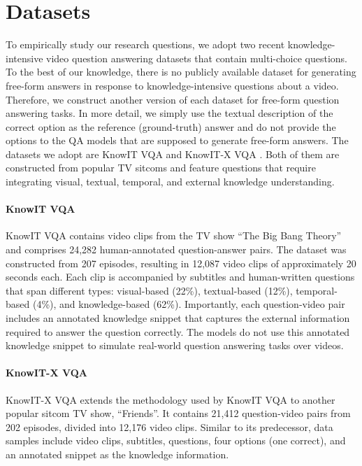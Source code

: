 \section{Datasets}
\label{sec:data}
To empirically study our research questions, we adopt two recent knowledge-intensive video question answering datasets that contain multi-choice questions. To the best of our knowledge, there is no publicly available dataset for generating free-form answers in response to knowledge-intensive questions about a video. Therefore, we construct another version of each dataset for free-form question answering tasks. In more detail, we simply use the textual description of the correct option as the reference (ground-truth) answer and do not provide the options to the QA models that are supposed to generate free-form answers. The datasets we adopt are KnowIT VQA \cite{garcia2020knowit} and KnowIT-X VQA \cite{wu2021transferring}. Both of them are constructed from popular TV sitcoms and feature questions that require integrating visual, textual, temporal, and external knowledge understanding.

\paragraph{\textbf{KnowIT VQA}}
KnowIT VQA \cite{garcia2020knowit} contains video clips from the TV show ``The Big Bang Theory'' and comprises 24,282 human-annotated question-answer pairs. The dataset was constructed from 207 episodes, resulting in 12,087 video clips of approximately 20 seconds each. Each clip is accompanied by subtitles and human-written questions that span different types: visual-based (22\%), textual-based (12\%), temporal-based (4\%), and knowledge-based (62\%). Importantly, each question-video pair includes an annotated knowledge snippet that captures the external information required to answer the question correctly. The models do not use this annotated knowledge snippet to simulate real-world question answering tasks over videos.

\paragraph{\textbf{KnowIT-X VQA}}
KnowIT-X VQA \cite{wu2021transferring} extends the methodology used by KnowIT VQA to another popular sitcom TV show, ``Friends''. It contains 21,412 question-video pairs from 202 episodes, divided into 12,176 video clips. Similar to its predecessor, data samples include video clips, subtitles, questions, four options (one correct), and an annotated snippet as the knowledge information.


